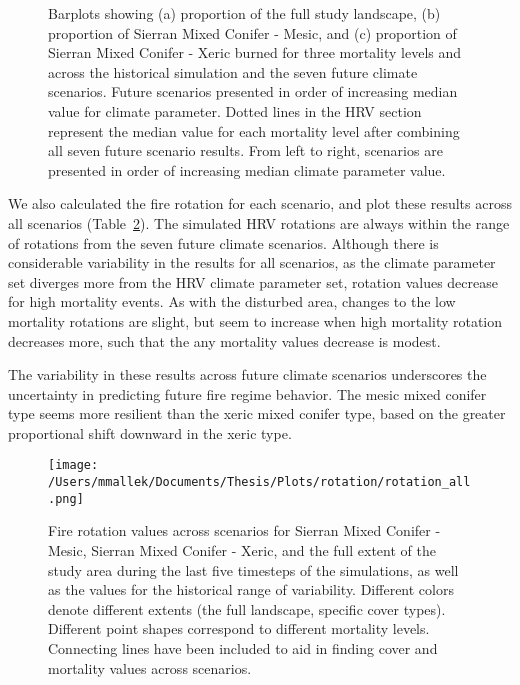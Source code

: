 \documentclass[12pt]{article}
\begin{document}
\begin{spacing}{1}
\begin{figure}[!htbp]
  \centering


    \caption{Barplots showing (a) proportion of the full study landscape, (b) proportion of Sierran Mixed Conifer - Mesic, and (c) proportion of Sierran Mixed Conifer - Xeric burned for three mortality levels and across the historical simulation and the seven future climate scenarios. Future scenarios presented in order of increasing median value for climate parameter. Dotted lines in the HRV section represent the median value for each mortality level after combining all seven future scenario results. From left to right, scenarios are presented in order of increasing median climate parameter value.}
  \label{fig:dareacomp}
\end{figure}

We also calculated the fire rotation for each scenario, and plot these results across all scenarios (Table~\ref{fig:frotation}). The simulated HRV rotations are always within the range of rotations from the seven future climate scenarios. Although there is considerable variability in the results for all scenarios, as the climate parameter set diverges more from the HRV climate parameter set, rotation values decrease for high mortality events. As with the disturbed area, changes to the low mortality rotations are slight, but seem to increase when high mortality rotation decreases more, such that the any mortality values decrease is modest. 

The variability in these results across future climate scenarios underscores the uncertainty in predicting future fire regime behavior. The mesic mixed conifer type seems more resilient than the xeric mixed conifer type, based on the greater proportional shift downward in the xeric type.


\begin{figure}
\centering
\texttt{[image: /Users/mmallek/Documents/Thesis/Plots/rotation/rotation\_all.png]}
\caption{Fire rotation values across scenarios for Sierran Mixed Conifer - Mesic, Sierran Mixed Conifer - Xeric, and the full extent of the study area during the last five timesteps of the simulations, as well as the values for the historical range of variability. Different colors denote different extents (the full landscape, specific cover types). Different point shapes correspond to different mortality levels. Connecting lines have been included to aid in finding cover and mortality values across scenarios.}
\label{fig:frotation}
\end{figure}



\end{spacing}
\end{document}
